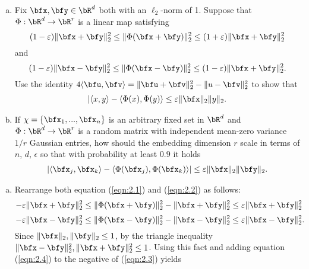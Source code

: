 \begin{homework}[e]
  \prob 
  \prob$ $
  \begin{enumerate}[(a)]
    \item Fix $\bfx, \bfy \in \bR^d$ both with an $\ell_2$-norm of 1. Suppose that $\Phi:\bR^d\to \bR^r$ is a linear map satisfying
      \begin{equation}\label{eqn:2.1}
        (1  - \epsilon)\|\bfx + \bfy\|_2^2 \leq \|\Phi(\bfx + \bfy)\|^2_2 \leq (1+\epsilon)\|\bfx + \bfy\|^2_2
      \end{equation}
      and
      \begin{equation}\label{eqn:2.2}
        (1  - \epsilon)\|\bfx - \bfy\|_2^2 \leq \|\Phi(\bfx - \bfy)\|^2_2 \leq (1-\epsilon)\|\bfx + \bfy\|^2_2.
      \end{equation}
      Use the identity $4\langle \bfu, \bfv \rangle = \|\bfu + \bfv\|^2_2 - \|u-\bfv\|^2_2$ to show that
      \begin{align*}
        |\langle x,y \rangle - \langle \Phi(x),\Phi(y) \rangle \leq \epsilon\|\bfx\|_2\|y\|_2.
      \end{align*}
    \item If $\chi = \{\bfx_1,...,\bfx_n\}$ is an arbitrary fixed set in $\bR^d$ and $\Phi:\bR^d \to \bR^r$ is a random matrix with independent mean-zero variance $1/r$ Gaussian entries, how should the embedding dimension $r$ scale in terms of $n$, $d$, $\epsilon$ so that with probability at least $0.9$ it holds
      \begin{align*}
        |\langle \bfx_j,\bfx_k \rangle - \langle \Phi(\bfx_j),\Phi(\bfx_k) \rangle| \leq \epsilon \|\bfx\|_2\|\bfy\|_2.
      \end{align*}
  \end{enumerate}
  \begin{prf}
    \begin{enumerate}[(a)]
      \item Rearrange both equation (\ref{eqn:2.1}) and (\ref{eqn:2.2}) as follows:
        \begin{equation}\label{eqn:2.3}
          -\epsilon\|\bfx +\bfy\|_2^2 \leq \|\Phi(\bfx + \bfy)\|_2^2 - \|\bfx + \bfy\|_2^2 \leq \epsilon\|\bfx + \bfy\|^2_2
        \end{equation}
        \begin{equation}\label{eqn:2.4}
          -\epsilon\|\bfx -\bfy\|_2^2 \leq \|\Phi(\bfx - \bfy)\|_2^2 - \|\bfx - \bfy\|_2^2 \leq \epsilon\|\bfx - \bfy\|^2_2.
        \end{equation}
        Since $\|\bfx\|_2,\|\bfy\|_2\leq 1$, by the triangle inequality $\|\bfx - \bfy\|_2^2, \|\bfx + \bfy\|_2^2 \leq 1$. Using this fact and adding equation (\ref{eqn:2.4}) to the negative of (\ref{eqn:2.3}) yields

\end{enumerate}
\end{prf}
\end{homework}
